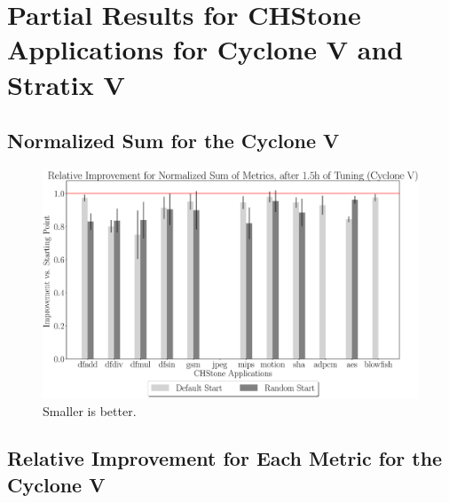 \documentclass[12pt, a4paper]{article}
\begin{document}
\section{Partial Results for CHStone Applications for Cyclone V and Stratix V}

\subsection{Normalized Sum for the Cyclone V}

\begin{figure}[htpb]
    \centering
    \includegraphics[width=.4\textwidth]{rel_comp_nsam_5400_chstone_CycloneV}
    \caption{Smaller is better.}
\end{figure}

\subsection{Relative Improvement for Each Metric for the Cyclone V}
\end{document}
